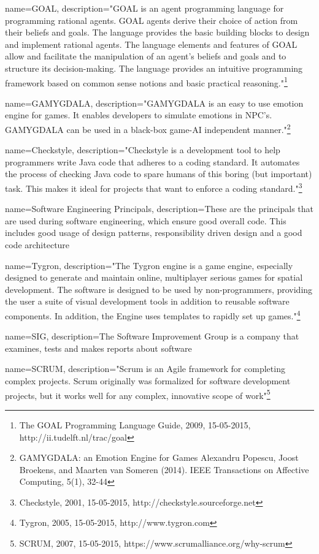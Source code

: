 {
  name=GOAL,
  description={"GOAL is an agent programming language for programming rational agents. GOAL agents derive their choice of action from their beliefs and goals. The language provides the basic building blocks to design and implement rational agents. The language elements and features of GOAL allow and facilitate the manipulation of an agent's beliefs and goals and to structure its decision-making. The language provides an intuitive programming framework based on common sense notions and basic practical reasoning."\footnote{The GOAL Programming Language Guide, 2009, 15-05-2015, http://ii.tudelft.nl/trac/goal}}
}

{
  name=GAMYGDALA,
  description={"GAMYGDALA is an easy to use emotion engine for games. It enables developers to simulate emotions in NPC's. GAMYGDALA can be used in a black-box game-AI independent manner."\footnote{GAMYGDALA: an Emotion Engine for Games Alexandru Popescu, Joost Broekens, and Maarten van Someren (2014). IEEE Transactions on Affective Computing, 5(1), 32-44}}
}

{
  name=Checkstyle,
  description={"Checkstyle is a development tool to help programmers write Java code that adheres to a coding standard. It automates the process of checking Java code to spare humans of this boring (but important) task. This makes it ideal for projects that want to enforce a coding standard."\footnote{Checkstyle, 2001, 15-05-2015, http://checkstyle.sourceforge.net}}
}

{
  name=Software Engineering Principals,
  description={These are the principals that are used during software engineering, which ensure good overall code. This includes good usage of design patterns, responsibility driven design and a good code architecture}
}

{
  name=Tygron,
  description={"The Tygron engine is a game engine, especially designed to generate and maintain online, multiplayer serious games for spatial development. The software is designed to be used by non-programmers, providing the user a suite of visual development tools in addition to reusable software components. In addition, the Engine uses templates to rapidly set up games."\footnote{Tygron, 2005, 15-05-2015, http://www.tygron.com}}
}

{
  name=SIG,
  description={The Software Improvement Group is a company that examines, tests and makes reports about software}
}

{
  name=SCRUM,
  description={"Scrum is an Agile framework for completing complex projects. Scrum originally was formalized for software development projects, but it works well for any complex, innovative scope of work"\footnote{SCRUM, 2007, 15-05-2015, https://www.scrumalliance.org/why-scrum}}
}